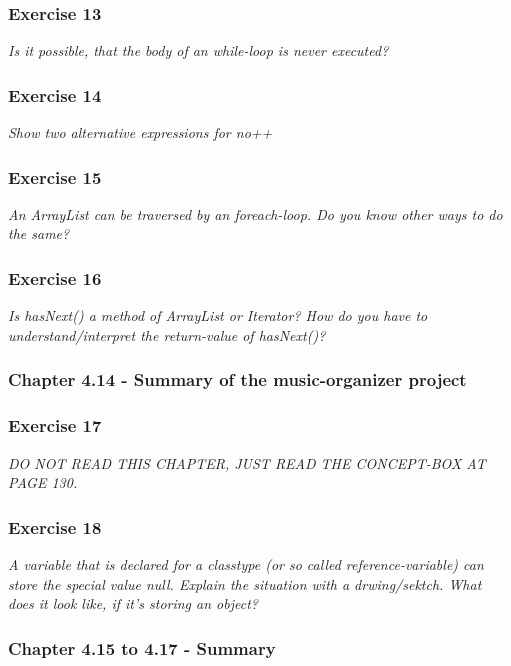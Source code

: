 \subsubsection*{Exercise 13}
\textit{Is it possible, that the body of an while-loop is never executed?}\\

\subsubsection*{Exercise 14}
\textit{Show two alternative expressions for no++}\\

\subsubsection*{Exercise 15}
\textit{An ArrayList can be traversed by an foreach-loop. Do you know other
ways to do the same?}\\

\subsubsection*{Exercise 16}
\textit{Is hasNext() a method of ArrayList or Iterator? How do you have to 
understand/interpret the return-value of hasNext()?}\\

\subsubsection{Chapter 4.14 - Summary of the music-organizer project}

\subsubsection*{Exercise 17}
\textit{DO NOT READ THIS CHAPTER, JUST READ THE CONCEPT-BOX AT PAGE 130.}\\

\subsubsection*{Exercise 18}
\textit{A variable that is declared for a classtype (or so called 
reference-variable) can store the special value null. Explain the situation 
with a drwing/sektch. What does it look like, if it's storing an object?}\\

\subsubsection{Chapter 4.15 to 4.17 - Summary}

